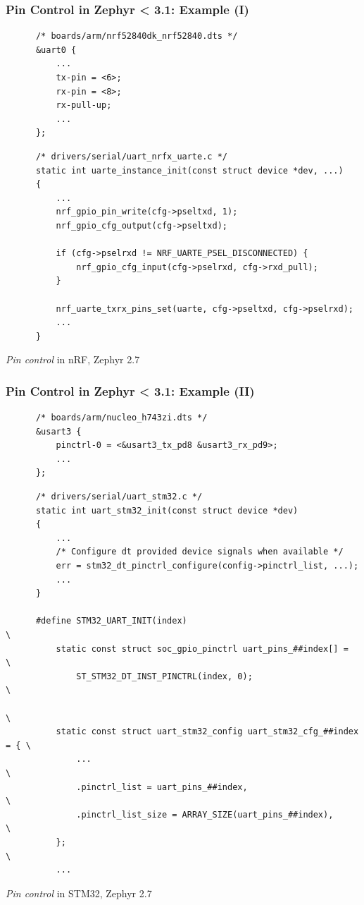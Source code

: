 \documentclass[handout]{beamer}
\begin{document}
\begin{frame}[fragile]
  \frametitle{Pin Control in Zephyr < 3.1: Example (I)}

  \begin{listing}[H]
    \begin{verbatim}
      /* boards/arm/nrf52840dk_nrf52840.dts */
      &uart0 {
          ...
          tx-pin = <6>;
          rx-pin = <8>;
          rx-pull-up;
          ...
      };
    \end{verbatim}
    \begin{verbatim}
      /* drivers/serial/uart_nrfx_uarte.c */
      static int uarte_instance_init(const struct device *dev, ...)
      {
          ...
          nrf_gpio_pin_write(cfg->pseltxd, 1);
          nrf_gpio_cfg_output(cfg->pseltxd);

          if (cfg->pselrxd != NRF_UARTE_PSEL_DISCONNECTED) {
              nrf_gpio_cfg_input(cfg->pselrxd, cfg->rxd_pull);
          }

          nrf_uarte_txrx_pins_set(uarte, cfg->pseltxd, cfg->pselrxd);
          ...
      }
    \end{verbatim}
    \caption{\textit{Pin control} in nRF, Zephyr 2.7}
  \end{listing}
\end{frame}

\begin{frame}[fragile]
  \frametitle{Pin Control in Zephyr < 3.1: Example (II)}

  \begin{listing}[H]
    \begin{verbatim}
      /* boards/arm/nucleo_h743zi.dts */
      &usart3 {
          pinctrl-0 = <&usart3_tx_pd8 &usart3_rx_pd9>;
          ...
      };
    \end{verbatim}
    \begin{verbatim}
      /* drivers/serial/uart_stm32.c */
      static int uart_stm32_init(const struct device *dev)
      {
          ...
          /* Configure dt provided device signals when available */
          err = stm32_dt_pinctrl_configure(config->pinctrl_list, ...);
          ...
      }

      #define STM32_UART_INIT(index)                                       \
          static const struct soc_gpio_pinctrl uart_pins_##index[] =       \
              ST_STM32_DT_INST_PINCTRL(index, 0);                          \
                                                                           \
          static const struct uart_stm32_config uart_stm32_cfg_##index = { \
              ...                                                          \
              .pinctrl_list = uart_pins_##index,                           \
              .pinctrl_list_size = ARRAY_SIZE(uart_pins_##index),          \
          };                                                               \
          ...
    \end{verbatim}
    \caption{\textit{Pin control} in STM32, Zephyr 2.7}
  \end{listing}
\end{frame}
\end{document}
